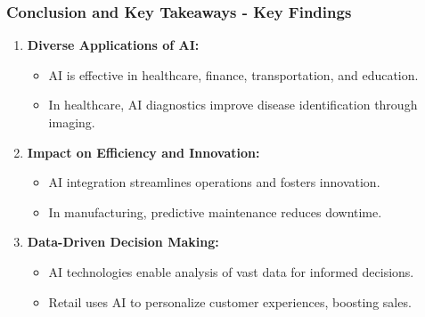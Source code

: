 \documentclass{beamer}
\begin{document}
\begin{frame}[fragile]
    \frametitle{Conclusion and Key Takeaways - Key Findings}
    \begin{enumerate}
        \item \textbf{Diverse Applications of AI:} 
        \begin{itemize}
            \item AI is effective in healthcare, finance, transportation, and education.
            \item In healthcare, AI diagnostics improve disease identification through imaging.
        \end{itemize}
        
        \item \textbf{Impact on Efficiency and Innovation:}
        \begin{itemize}
            \item AI integration streamlines operations and fosters innovation.
            \item In manufacturing, predictive maintenance reduces downtime.
        \end{itemize}

        \item \textbf{Data-Driven Decision Making:}
        \begin{itemize}
            \item AI technologies enable analysis of vast data for informed decisions.
            \item Retail uses AI to personalize customer experiences, boosting sales.
        \end{itemize}
    \end{enumerate}
\end{frame}
\end{document}
